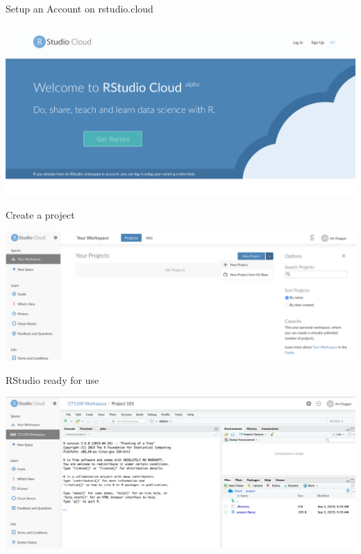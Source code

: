 \documentclass[ignorenonframetext,]{beamer}
\begin{document}
\begin{frame}{Setup an Account on rstudio.cloud}
\protect\hypertarget{setup-an-account-on-rstudio.cloud}{}

\includegraphics[width=1\linewidth]{images/02 RStudio Create}

\end{frame}

\begin{frame}{Create a project}
\protect\hypertarget{create-a-project}{}

\includegraphics[width=1\linewidth]{images/03 RStudioWorkspace}

\end{frame}

\begin{frame}{RStudio ready for use}
\protect\hypertarget{rstudio-ready-for-use}{}

\includegraphics[width=1\linewidth]{images/04 My Project}

\end{frame}
\end{document}
